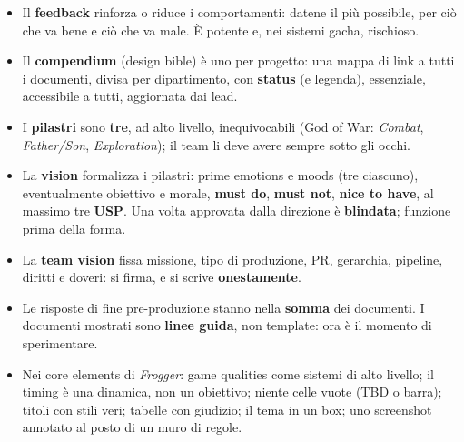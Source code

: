 \begin{itemize}
        demografiche, e bisogna chiedersi da dove vengono i dati (Reddit non
        è il mondo). Nei survey, \textbf{agency oculata}: risposte chiuse
        dove si può.
  \item Il \textbf{feedback} rinforza o riduce i comportamenti: datene il
        più possibile, per ciò che va bene e ciò che va male. È potente e,
        nei sistemi gacha, rischioso.
  \item Il \textbf{compendium} (design bible) è uno per progetto: una mappa
        di link a tutti i documenti, divisa per dipartimento, con
        \textbf{status} (e legenda), essenziale, accessibile a tutti,
        aggiornata dai lead.
  \item I \textbf{pilastri} sono \textbf{tre}, ad alto livello,
        inequivocabili (God of War: \emph{Combat}, \emph{Father/Son},
        \emph{Exploration}); il team li deve avere sempre sotto gli occhi.
  \item La \textbf{vision} formalizza i pilastri: prime emotions e moods (tre
        ciascuno), eventualmente obiettivo e morale, \textbf{must do},
        \textbf{must not}, \textbf{nice to have}, al massimo tre
        \textbf{USP}. Una volta approvata dalla direzione è
        \textbf{blindata}; funzione prima della forma.
  \item La \textbf{team vision} fissa missione, tipo di produzione, PR,
        gerarchia, pipeline, diritti e doveri: si firma, e si scrive
        \textbf{onestamente}.
  \item Le risposte di fine pre-produzione stanno nella \textbf{somma} dei
        documenti. I documenti mostrati sono \textbf{linee guida}, non
        template: ora è il momento di sperimentare.
  \item Nei core elements di \emph{Frogger}: game qualities come sistemi di
        alto livello; il timing è una dinamica, non un obiettivo; niente
        celle vuote (TBD o barra); titoli con stili veri; tabelle con
        giudizio; il tema in un box; uno screenshot annotato al posto di un
        muro di regole.
\end{itemize}
